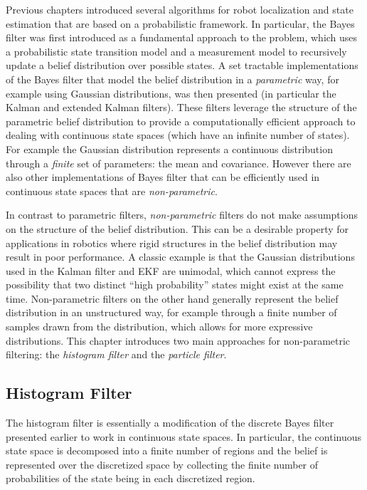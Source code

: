 Previous chapters introduced several algorithms for robot localization and state estimation that are based on a probabilistic framework. In particular, the Bayes filter was first introduced as a fundamental approach to the problem, which uses a probabilistic state transition model and a measurement model to recursively update a belief distribution over possible states. A set tractable implementations of the Bayes filter that model the belief distribution in a \textit{parametric} way, for example using Gaussian distributions, was then presented (in particular the Kalman and extended Kalman filters).
These filters leverage the structure of the parametric belief distribution to provide a computationally efficient approach to dealing with continuous state spaces (which have an infinite number of states). For example the Gaussian distribution represents a continuous distribution through a \textit{finite} set of parameters: the mean and covariance.
However there are also other implementations of Bayes filter that can be efficiently used in continuous state spaces that are \textit{non-parametric}. 

\cite{ThrunBurgardEtAl2005}
In contrast to parametric filters, \textit{non-parametric} filters do not make assumptions on the structure of the belief distribution. This can be a desirable property for applications in robotics where rigid structures in the belief distribution may result in poor performance. A classic example is that the Gaussian distributions used in the Kalman filter and EKF are unimodal, which cannot express the possibility that two distinct ``high probability'' states might exist at the same time.
Non-parametric filters on the other hand generally represent the belief distribution in an unstructured way, for example through a finite number of samples drawn from the distribution, which allows for more expressive distributions.
This chapter introduces two main approaches for non-parametric filtering: the \textit{histogram filter} and the \textit{particle filter}.

\subsection{Histogram Filter}
The histogram filter is essentially a modification of the discrete Bayes filter presented earlier to work in continuous state spaces. In particular, the continuous state space is decomposed into a finite number of regions and the belief is represented over the discretized space by collecting the finite number of probabilities of the state being in each discretized region.

